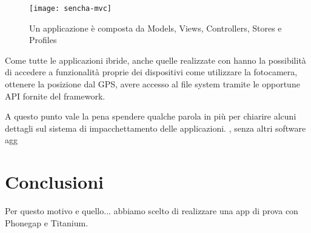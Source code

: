 			\begin{figure}[h]
				\centering
				\texttt{[image: sencha-mvc]}
				\caption{
					Un applicazione \senchat{} è composta da Models, Views,
					Controllers, Stores e Profiles
				}
				\label{fig:sencha_mvc}
			\end{figure}
			Come tutte le applicazioni ibride, anche quelle realizzate con
			\senchat{} hanno la possibilità di accedere a funzionalità proprie
			dei dispositivi come utilizzare la fotocamera, ottenere la posizione
			dal GPS, avere accesso al file sys\-tem tramite le opportune API
			fornite del framework.
			
			A questo punto vale la pena spendere qualche parola in più per
			chiarire alcuni dettagli sul sistema di impacchettamento delle
			applicazioni. \senchat{}, senza altri software agg
			
			
	
	\section{Conclusioni}
		Per questo motivo e quello... abbiamo scelto di realizzare una app di 
		prova con Phonegap e Titanium.
